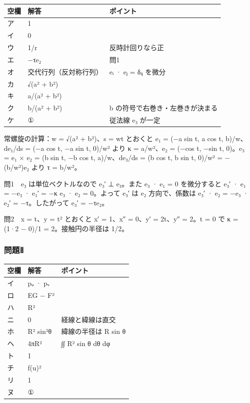 \documentclass[
  10pt,
  a4paper,
]{article}
\begin{document}
\begin{longtable}[]{@{}lll@{}}
\toprule\noalign{}
空欄 & 解答 & ポイント \\
\midrule\noalign{}
\endhead
\bottomrule\noalign{}
\endlastfoot
ア & 1 & \\
イ & 0 & \\
ウ & 1/r & 反時計回りなら正 \\
エ & −τe{\fallbackfont ₂} & 問1 \\
オ & 交代行列（反対称行列） & e{\fallbackfont ᵢ} · e{\fallbackfont ⱼ} =
δ{\fallbackfont ᵢⱼ} を微分 \\
カ & √(a² + b²) & \\
キ & a/(a² + b²) & \\
ク & b/(a² + b²) & b の符号で右巻き・左巻きが決まる \\
ケ & ① & 従法線 e{\fallbackfont ₃} が一定 \\
\end{longtable}

常螺旋の計算：w = √(a² + b²)、s = wt とおくと e{\fallbackfont ₁} = (−a
sin t, a cos t, b)/w、de{\fallbackfont ₁}/ds = (−a cos t, −a sin t,
0)/w² より κ = a/w²、e{\fallbackfont ₂} = (−cos t, −sin t,
0)。e{\fallbackfont ₃} = e{\fallbackfont ₁} × e{\fallbackfont ₂} = (b
sin t, −b cos t, a)/w、de{\fallbackfont ₃}/ds = (b cos t, b sin t, 0)/w²
= −(b/w²)e{\fallbackfont ₂} より τ = b/w²。

問1　e{\fallbackfont ₃} は単位ベクトルなので e{\fallbackfont ₃}′ ⊥
e{\fallbackfont ₃}。また e{\fallbackfont ₃} · e{\fallbackfont ₁} = 0
を微分すると e{\fallbackfont ₃}′ · e{\fallbackfont ₁} =
−e{\fallbackfont ₃} · e{\fallbackfont ₁}′ = −κ e{\fallbackfont ₃} ·
e{\fallbackfont ₂} = 0。よって e{\fallbackfont ₃}′ は e{\fallbackfont ₂}
方向で、係数は e{\fallbackfont ₃}′ · e{\fallbackfont ₂} =
−e{\fallbackfont ₃} · e{\fallbackfont ₂}′ = −τ。したがって
e{\fallbackfont ₃}′ = −τe{\fallbackfont ₂}。

問2　x = t、y = t² とおくと x′ = 1、x″ = 0、y′ = 2t、y″ = 2。t = 0 で κ
= (1·2 − 0)/1 = 2。接触円の半径は 1/2。

\hypertarget{ux554fux984cux2171}{%
\subsubsection{問題Ⅱ}\label{ux554fux984cux2171}}

\begin{longtable}[]{@{}lll@{}}
\toprule\noalign{}
空欄 & 解答 & ポイント \\
\midrule\noalign{}
\endhead
\bottomrule\noalign{}
\endlastfoot
イ & p{\fallbackfont ᵤ} · p{\fallbackfont ᵥ} & \\
ロ & EG − F² & \\
ハ & R² & \\
ニ & 0 & 経線と緯線は直交 \\
ホ & R² sin²θ & 緯線の半径は R sin θ \\
ヘ & 4πR² & ∫∫ R² sin θ dθ dφ \\
ト & 1 & \\
チ & f(u)² & \\
リ & 1 & \\
ヌ & ① & \\
\end{longtable}
\end{document}
